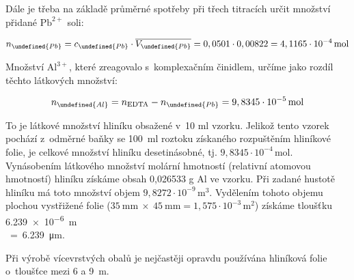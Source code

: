 \documentclass{book}
\let\ch\undefined
\begin{document}
Dále je třeba na základě průměrné spotřeby při třech titracích určit
množství přidané $\mathrm{Pb^{2+}}$ soli: 

\[
n_{\ch{Pb}}=c_{\ch{Pb}}\cdot\overline{V_{\ch{Pb}}}=0,0501\cdot0,00822=4,1165\cdot10^{-4}\,\mathrm{mol}
\]
 

Množství $\mathrm{Al^{3+}}$, které zreagovalo s~komplexačním činidlem,
určíme jako rozdíl těchto látkových množství: 

\[
n_{\ch{Al}}=n_{\mathrm{EDTA}}-n_{\ch{Pb}}=9,8345\cdot10^{-5}\,\mathrm{mol}
\]

To je látkové množství hliníku obsažené v~10 ml vzorku. Jelikož tento
vzorek pochází z~odměrné baňky se 100~ml roztoku získaného rozpuštěním
hliníkové folie, je celkové množství hliníku desetinásobné, tj. $9,8345\cdot10^{-4}\,\mathrm{mol}$.
Vynásobením látkového množství molární hmotností (relativní atomovou
hmotností) hliníku získáme obsah 0,026533 g Al ve vzorku. Při zadané
hustotě hliníku má toto množství objem $9,8272\cdot10^{-9}\,\mathrm{m^{3}}$.
Vydělením tohoto objemu plochou vystřižené folie ($\mathrm{35\:mm\:\times\:45\:mm}=1,575\cdot10^{-3}\,\mathrm{m^{2}}$)
získáme tloušťku
\SI[exponent-product = \ensuremath{{}\cdot{}},output-decimal-marker = {,}]{6,239e-6}{\metre}
\\$\ =\ $\SI[output-decimal-marker = {,}]{6,239}{\micro\metre}. 

Při výrobě vícevrstvých obalů je nejčastěji opravdu používána hliníková
folie o~tloušťce mezi 6 a 9~\textmu m. 
\end{document}
